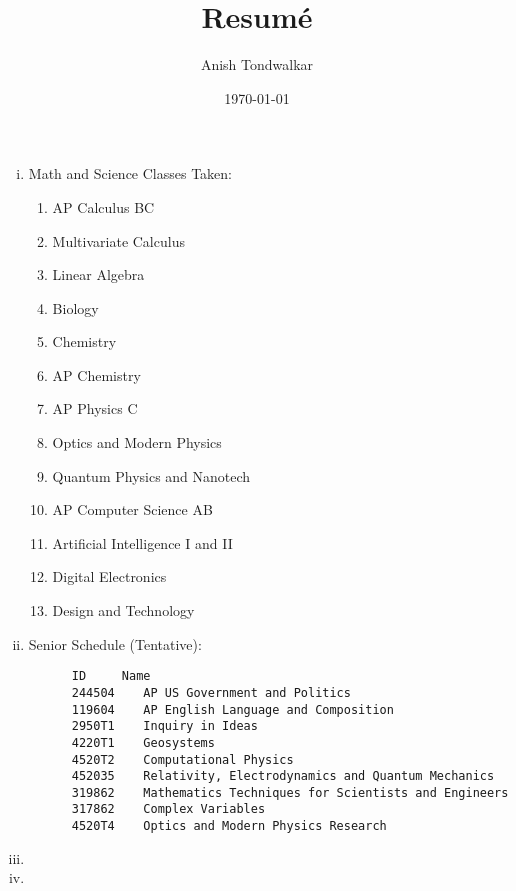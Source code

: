 \documentclass[11pt,notitlepage]{article}
\title{Resum\'e}
\author{Anish Tondwalkar}
\date{\today}
\begin{document}
\maketitle
\begin{enumerate}[i)]
  \item Math and Science Classes Taken: 
    \begin{enumerate}
    \item AP Calculus BC
    \item Multivariate Calculus
    \item Linear Algebra
    \item Biology
    \item Chemistry
    \item AP Chemistry
    \item AP Physics C
    \item Optics and Modern Physics
    \item Quantum Physics and Nanotech
    \item AP Computer Science AB
    \item Artificial Intelligence I and II
    \item Digital Electronics
    \item Design and Technology  
  \end{enumerate}
  \item Senior Schedule (Tentative): 
\begin{verbatim}
      ID     Name	
      244504	AP US Government and Politics
      119604	AP English Language and Composition
      2950T1	Inquiry in Ideas
      4220T1	Geosystems
      4520T2	Computational Physics
      452035	Relativity, Electrodynamics and Quantum Mechanics
      319862	Mathematics Techniques for Scientists and Engineers
      317862	Complex Variables
      4520T4	Optics and Modern Physics Research
\end{verbatim}
  \item 
 \item
\end{enumerate}
\end{document}
